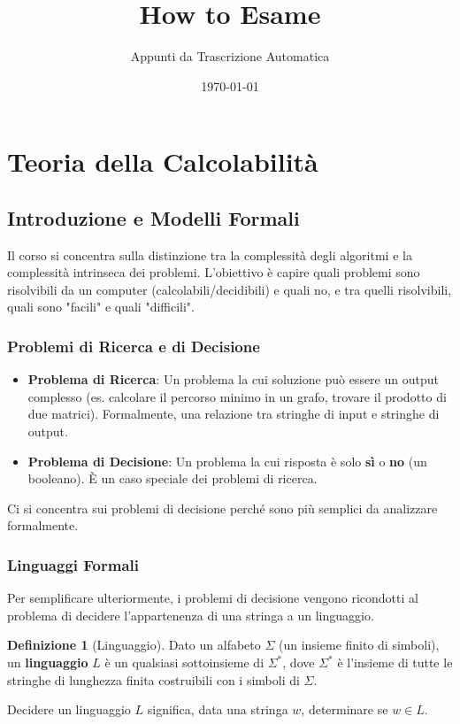 \documentclass[a4paper]{article}
\title{How to Esame}
\author{Appunti da Trascrizione Automatica}
\date{\today}
\theoremstyle{definition} %
\newtheorem{definition}{Definizione}
\begin{document}
\maketitle
\tableofcontents
\newpage

\section{Teoria della Calcolabilità}

\subsection{Introduzione e Modelli Formali}
Il corso si concentra sulla distinzione tra la complessità degli algoritmi e la complessità intrinseca dei problemi. L'obiettivo è capire quali problemi sono risolvibili da un computer (calcolabili/decidibili) e quali no, e tra quelli risolvibili, quali sono "facili" e quali "difficili".

\subsubsection{Problemi di Ricerca e di Decisione}
\begin{itemize}
    \item \textbf{Problema di Ricerca}: Un problema la cui soluzione può essere un output complesso (es. calcolare il percorso minimo in un grafo, trovare il prodotto di due matrici). Formalmente, una relazione tra stringhe di input e stringhe di output.
    \item \textbf{Problema di Decisione}: Un problema la cui risposta è solo \textbf{sì} o \textbf{no} (un booleano). È un caso speciale dei problemi di ricerca.
\end{itemize}
Ci si concentra sui problemi di decisione perché sono più semplici da analizzare formalmente.

\subsubsection{Linguaggi Formali}
Per semplificare ulteriormente, i problemi di decisione vengono ricondotti al problema di decidere l'appartenenza di una stringa a un linguaggio.
\begin{definition}[Linguaggio]
Dato un alfabeto $\Sigma$ (un insieme finito di simboli), un \textbf{linguaggio} $L$ è un qualsiasi sottoinsieme di $\Sigma^*$, dove $\Sigma^*$ è l'insieme di tutte le stringhe di lunghezza finita costruibili con i simboli di $\Sigma$.
\end{definition}
Decidere un linguaggio $L$ significa, data una stringa $w$, determinare se $w \in L$.
\end{document}

